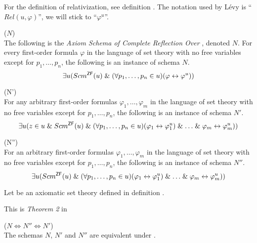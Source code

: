 For the definition of relativization, see definition . The notation used by Lévy is ``$Rel(u, \varphi)$'', we will stick to ``$\varphi^{u}$''.
\begin{definition}{($N$)}\label{def:levy_axiom_n}\\
The following is the \emph{Axiom Schema of Complete Reflection Over }, denoted $N$. For every first-order formula $\varphi$ in the language of set theory with no free variables except for $p_1, \ldots , p_n$, the following is an instance of schema $N$.
\begin{equation}
\exists u (Scm^{\sf{ZF}}(u) \mathrel{\&} (\forall p_1, \ldots, p_n \in u)(\varphi \leftrightarrow \varphi^{u}))
\end{equation}
\end{definition}

\begin{definition}{(N')}\label{def:levy_axiom_n'}\\
For any arbitrary first-order formulas $\varphi_1, \ldots, \varphi_m$ in the language of set theory with no free variables except for $p_1, \ldots , p_n$, the following is an instance of schema $N'$.
\begin{equation}
\exists u (z \in u \mathrel{\&} Scm^{\sf{ZF}}(u) \mathrel{\&} (\forall p_1, \ldots, p_n \in u)(\varphi_1 \leftrightarrow \varphi_1^{u}) \mathrel{\&} \ldots \mathrel{\&} \varphi_m \leftrightarrow \varphi_m^{u}))
\end{equation}
\end{definition}

\begin{definition}{(N'')}\label{def:levy_axiom_n''}\\
For an arbitrary first-order formulas $\varphi_1, \ldots, \varphi_m$ in the language of set theory with no free variables except for $p_1, \ldots , p_n$, the following is an instance of schema $N''$.
\begin{equation}
\exists u (Scm^{\sf{ZF}}(u) \mathrel{\&} (\forall p_1, \ldots, p_n \in u)(\varphi_1 \leftrightarrow \varphi_1^{u}) \mathrel{\&} \ldots \mathrel{\&} \varphi_m \leftrightarrow \varphi_m^{u}))
\end{equation}
\end{definition}

Let  be an axiomatic set theory defined in definition .

This is \emph{Theorem 2} in \cite{Levy60a}
\begin{lemma}{($N \iff N'' \iff N'$)}\label{lemma:n_iff_n'}\\
The schemas $N$, $N'$ and $N''$ are equivalent under .
\end{lemma}

